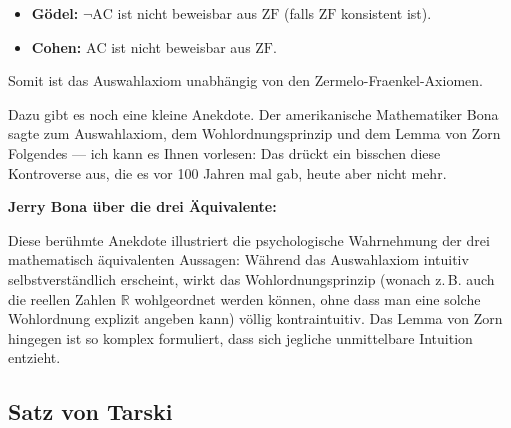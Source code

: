 \begin{math-stroke}
\begin{remark}
\begin{itemize}
    \item \textbf{Gödel:} $\neg \text{AC}$ ist nicht beweisbar aus $\text{ZF}$ (falls $\text{ZF}$ konsistent ist).
    \item \textbf{Cohen:} $\text{AC}$ ist nicht beweisbar aus $\text{ZF}$.
\end{itemize}
Somit ist das Auswahlaxiom unabhängig von den Zermelo-Fraenkel-Axiomen.
\end{remark}
\end{math-stroke}

\begin{spoken-clean}[01:06:40 - 01:08:40]
Dazu gibt es noch eine kleine Anekdote. Der amerikanische Mathematiker Bona sagte zum Auswahlaxiom, dem Wohlordnungsprinzip und dem Lemma von Zorn Folgendes --- ich kann es Ihnen vorlesen:  Das drückt ein bisschen diese Kontroverse aus, die es vor 100 Jahren mal gab, heute aber nicht mehr.
\end{spoken-clean}

\begin{didactic-insight}
\textbf{Jerry Bona über die drei Äquivalente:}
\begin{quote}
\end{quote}
Diese berühmte Anekdote illustriert die psychologische Wahrnehmung der drei mathematisch äquivalenten Aussagen: Während das Auswahlaxiom intuitiv selbstverständlich erscheint, wirkt das Wohlordnungsprinzip (wonach z.\,B. auch die reellen Zahlen $\mathbb{R}$ wohlgeordnet werden können, ohne dass man eine solche Wohlordnung explizit angeben kann) völlig kontraintuitiv. Das Lemma von Zorn hingegen ist so komplex formuliert, dass sich jegliche unmittelbare Intuition entzieht.
\end{didactic-insight}

\subsection{Satz von Tarski}

